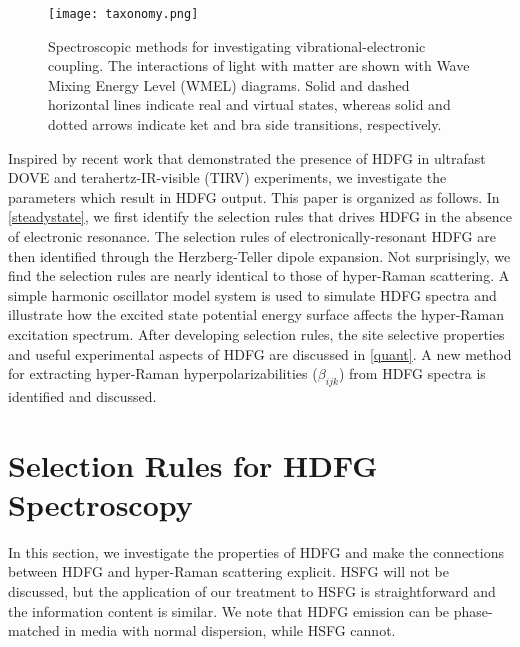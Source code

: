 \documentclass[aip, jcp, reprint, onecolumn]{revtex4-2}
\begin{document}
\begin{figure*}[!htbp]
	\centering
	\texttt{[image: taxonomy.png]}
	\caption{
		Spectroscopic methods for investigating vibrational-electronic coupling.
		The interactions of light with matter are shown with Wave Mixing Energy Level (WMEL) diagrams.\cite{RN286}
		Solid and dashed horizontal lines indicate real and virtual states, whereas solid and dotted arrows indicate ket and bra side transitions, respectively. 
	}
	\label{fig:comparisonwmel}
\end{figure*}

Inspired by recent work that demonstrated the presence of HDFG in ultrafast DOVE and terahertz-IR-visible (TIRV) experiments, we investigate the parameters which result in HDFG output. \cite{Cho2000, Bonn2024, McDonnell2024}
This paper is organized as follows.
In \autoref{steadystate}, we first identify the selection rules that drives HDFG in the absence of electronic resonance. 
The selection rules of electronically-resonant HDFG are then identified through the Herzberg-Teller dipole expansion.
Not surprisingly, we find the selection rules are nearly identical to those of hyper-Raman scattering.
A simple harmonic oscillator model system is used to simulate HDFG spectra and illustrate how the excited state potential energy surface affects the hyper-Raman excitation spectrum.
After developing selection rules, the site selective properties and useful experimental aspects of HDFG are discussed in \autoref{quant}.
A new method for extracting hyper-Raman hyperpolarizabilities ($\beta_{ijk}$) from HDFG spectra is identified and discussed.

\section{Selection Rules for HDFG Spectroscopy}\label{steadystate}

In this section, we investigate the properties of HDFG and make the connections between HDFG and hyper-Raman scattering explicit.
HSFG will not be discussed, but the application of our treatment to HSFG is straightforward and the information content is similar.
We note that HDFG emission can be phase-matched in media with normal dispersion,\cite{RN278} while HSFG cannot. 
\end{document}
